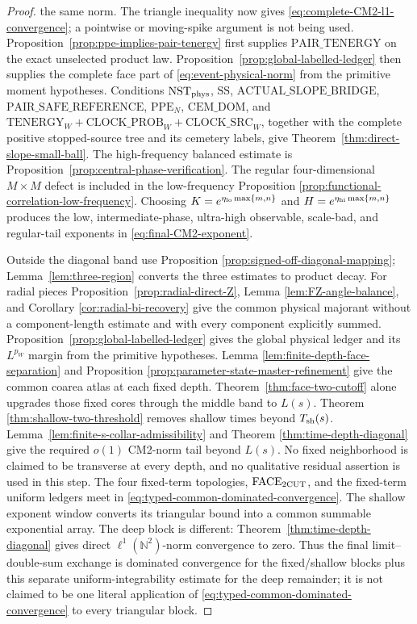 \documentclass[11pt]{article}
\begin{document}
\begin{proof}
the same norm.  The triangle inequality now gives
\eqref{eq:complete-CM2-l1-convergence}; a pointwise or moving-spike argument
is not being used.
Proposition~\ref{prop:ppe-implies-pair-tenergy} first supplies
$\mathrm{PAIR\_TENERGY}$ on the exact unselected product law.
Proposition~\ref{prop:global-labelled-ledger} then supplies the complete face
part of \eqref{eq:event-physical-norm} from the primitive moment hypotheses.
Conditions $\mathrm{NST}_{\rm phys}$, $\mathrm{SS}$,
$\mathrm{ACTUAL\_SLOPE\_BRIDGE}$, $\mathrm{PAIR\_SAFE\_REFERENCE}$,
$\mathrm{PPE}_{N}$, $\mathrm{CEM\_DOM}$, and
$\mathrm{TENERGY}_{W}+\mathrm{CLOCK\_PROB}_{W}
+\mathrm{CLOCK\_SRC}_{W}$, together with the complete
positive stopped-source tree and its cemetery labels, give
Theorem~\ref{thm:direct-slope-small-ball}.  The high-frequency balanced
estimate is Proposition~\ref{prop:central-phase-verification}.  The regular
four-dimensional $M\times M$ defect is included in the low-frequency Proposition
\ref{prop:functional-correlation-low-frequency}.  Choosing
$K=e^{\eta_{\rm lo}\max\{m,n\}}$ and
$H=e^{\eta_{\rm hi}\max\{m,n\}}$ produces the low, intermediate-phase,
ultra-high observable, scale-bad, and regular-tail exponents in
\eqref{eq:final-CM2-exponent}.

Outside the diagonal band use Proposition
\ref{prop:signed-off-diagonal-mapping};
Lemma~\ref{lem:three-region} converts the three estimates to product decay.
For radial pieces Proposition~\ref{prop:radial-direct-Z}, Lemma
\ref{lem:FZ-angle-balance}, and Corollary
\ref{cor:radial-bi-recovery} give the common physical majorant without a
component-length estimate and with every component explicitly summed.
Proposition~\ref{prop:global-labelled-ledger} gives the global physical
ledger and its $L^{p_W}$ margin from the primitive hypotheses.  Lemma
\ref{lem:finite-depth-face-separation} and Proposition
\ref{prop:parameter-state-master-refinement} give the common coarea atlas at
each fixed depth.  Theorem~\ref{thm:face-two-cutoff} alone upgrades those
fixed cores through the middle band to $L(s)$.  Theorem
\ref{thm:shallow-two-threshold} removes shallow times beyond
$T_{\rm sh}(s)$.  Lemma~\ref{lem:finite-s-collar-admissibility} and Theorem
\ref{thm:time-depth-diagonal} give the required $o(1)$ CM2-norm tail beyond
$L(s)$.  No fixed neighborhood is
claimed to be transverse at every depth, and no qualitative residual
assertion is used in this step.  The four fixed-term topologies,
$\mathrm{FACE}_{\rm 2CUT}$, and the fixed-term uniform ledgers meet in
\eqref{eq:typed-common-dominated-convergence}.  The shallow exponent window
converts its triangular bound into a common summable exponential array.
The deep block is different: Theorem~\ref{thm:time-depth-diagonal} gives
direct $\ell^1(\mathbb N^2)$-norm convergence to zero.  Thus the final
limit--double-sum exchange is dominated convergence for the fixed/shallow
blocks plus this separate uniform-integrability estimate for the deep
remainder; it is not claimed to be one literal application of
\eqref{eq:typed-common-dominated-convergence} to every triangular block.
\end{proof}
\end{document}
